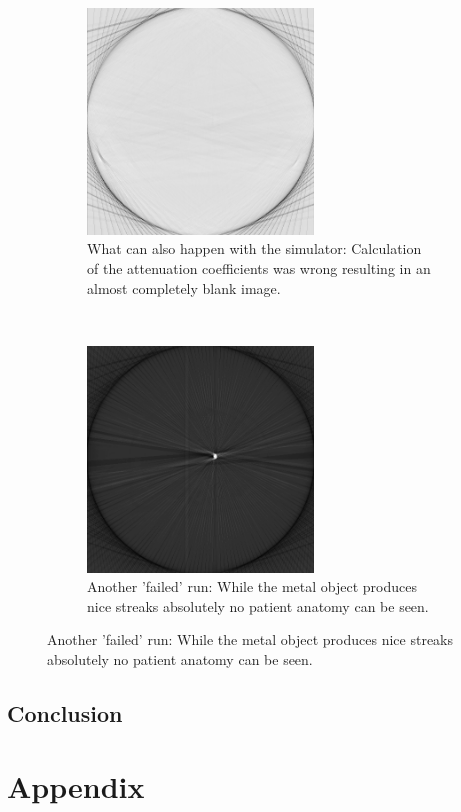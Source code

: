 \begin{figure}[h!]
	\centering		
	\begin{subfigure}[h]{0.45\textwidth}
		\centering
		\includegraphics[height=6cm]{images/sim07.png}
		\caption{What can also happen with the simulator: Calculation of the attenuation coefficients was wrong resulting in an almost completely blank image.}
		\label{sim07}
	\end{subfigure}%
	~
	\begin{subfigure}[h]{0.45\textwidth}
		\centering
		\includegraphics[height=6cm]{images/sim08.png}
		\caption{Another 'failed' run: While the metal object produces nice streaks absolutely no patient anatomy can be seen.}
		\label{sim08}
	\end{subfigure}%
\end{figure}
\chapter{Conclusion}




%
%
\part*{Appendix}

